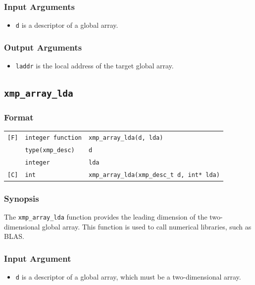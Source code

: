 \subsubsection*{Input Arguments}
\begin{itemize}
 \item {\tt d} is a descriptor of a global array.
\end{itemize}

\subsubsection*{Output Arguments}
\begin{itemize}
 \item {\tt laddr} is the local address of the target global array.
\end{itemize}


\subsection{\tt xmp\_array\_lda}\label{subsec:xmparraylda}

\subsubsection*{Format}
\begin{tabular}{lll}
\verb![F]!& {\tt integer function}& {\tt xmp\_array\_lda(d, lda)}\\
          & {\tt type(xmp\_desc)} & {\tt d}\\
          & {\tt integer} & {\tt lda}\\
\verb![C]!&  {\tt int}& {\tt xmp\_array\_lda(xmp\_desc\_t d, int* lda)}\\
\end{tabular}

\subsubsection*{Synopsis}
The {\tt xmp\_array\_lda} function provides the leading dimension of the two-dimensional global array.
This function is used to call numerical libraries, such as BLAS.

\subsubsection*{Input Argument}
\begin{itemize}
 \item {\tt d} is a descriptor of a global array, which must be a two-dimensional array.
\end{itemize}

